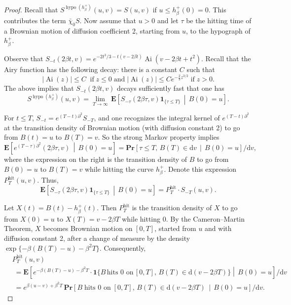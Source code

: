 \documentclass[AHL,Unicode,longabstracts]{cedram}
\newcommand*{\dd}{\mathrm{d}}
\newcommand*{\dv}{\dd v}
\DeclareMathOperator{\hit}{hit}
\DeclareMathOperator{\hypo}{hypo}
\DeclareMathOperator{\Ai}{Ai}
\newcommand{\E}[1]{\mathbf{E}\left[#1\right]}
\newcommand{\pr}[1]{\mathbf{Pr}\left[#1\right]}
\newcommand{\ind}[1]{\mathbf{1}_{\{ #1 \}}}
\begin{document}
\begin{proof}
Recall that $S^{\hypo(h^{+}_{\beta})}(u,v) = S(u,v)$ if $u \leq h^{+}_{\beta}(0) = 0$. This contributes the term $\bar{\chi}_0 S$. Now assume that $u > 0$ and let $\tau$ be the hitting time of a Brownian motion of diffusion coefficient 2, starting from $u$, to the hypograph of $h^{+}_{\beta}$.

Observe that $S_{-t}(2\beta t, v) = e^{-2t^3/3 -t(v-2\beta t)}\Ai(v-2\beta t + t^2)$. Recall that the Airy function has the following decay: there is a constant $C$ such that
\begin{equation}\label{eqn:Airydecay}
\mathopen|\Ai(z)| \leq C\;\;\text{if}\; z \leq 0 \;\text{and}\; \mathopen|\Ai(z)| \leq C e^{-\frac{2}{3} z^{3/2}} \; \text{if}\; z > 0.
\end{equation}
The above implies that $S_{-t}(2\beta t, v)$ decays sufficiently fast that one has
\[
S^{\hypo(h^{+}_{\beta})}(u,v) = \lim_{T \to \infty}\, \E{ S_{-\tau}(2 \beta \tau, v) \ind{\tau \leq T} \,\middle|\, B(0) = u}.
\]

For $t \leq T$, $S_{-t} = e^{(T-t)\partial^2} S_{-T}$, and one recognizes the integral kernel of $e^{(T-t)\partial^2}$ at the transition density of Brownian motion (with diffusion constant 2) to go from $B(t) = u$ to $B(T) = v$. So the strong Markov property implies
\[
\E{ e^{(T-\tau)\partial^2}(2\beta \tau, v) \,\middle|\, B(0)=u} = \pr{ \tau \leq T,\, B(T) \in \dv \,\middle|\, B(0) = u} / \dv,
\]
where the expression on the right is the transition density of $B$ to go from $B(0) = u$ to $B(T) = v$ while hitting the curve $h^{+}_{\beta}$. Denote this expression $P^{\hit}_T(u,v)$. Thus,
\[
\E{ S_{-\tau}(2 \beta \tau, v) \ind{\tau \leq T} \,\middle|\, B(0) = u} = P^{\hit}_T \cdot S_{-T}(u,v).
\]

Let $X(t) = B(t) - h^{+}_{\beta}(t)$. Then $P^{\hit}_T$ is the transition density of $X$ to go from $X(0) = u$ to $X(T) = v - 2\beta T$ while hitting $0$. By the Cameron--Martin Theorem, $X$ becomes Brownian motion on $[0,T]$, started from $u$ and with diffusion constant 2, after a change of measure by the density $\exp \{ -\beta (B(T)-u) - \beta^2T\}$. Consequently,
\begin{align*}
&P^{\hit}_T(u,v)\\
&\;=\E{e^{-\beta (B(T)-u) -\beta^2T} \cdot\mathbf{1}\big \{B\,\text{hits 0 on}\, [0,T], \, B(T) \in \dd(v-2\beta T) \big\}\middle|\, B(0)=u} /\dv \\
&\; = e^{\beta(u-v)+ \beta^2 T} \, \pr{ B \; \text{hits 0 on}\; [0,T], \, B(T) \in \dd(v-2\beta T) \,\middle|\, B(0) = u} / \dv.
\end{align*}


\end{proof}
\end{document}
